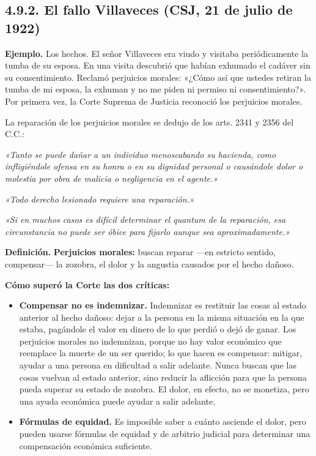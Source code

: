 \subsection{4.9.2. El fallo Villaveces (CSJ, 21 de julio de 1922)}
\begin{ejemplo}
\textcolor[HTML]{4F6228}{\textbf{Ejemplo. }}Los hechos. El señor Villaveces era viudo y visitaba periódicamente la tumba de su esposa. En una visita descubrió que habían exhumado el cadáver sin su consentimiento. Reclamó perjuicios morales: «¿Cómo así que ustedes retiran la tumba de mi esposa, la exhuman y no me piden ni permiso ni consentimiento?». Por primera vez, la Corte Suprema de Justicia reconoció los perjuicios morales.
\end{ejemplo}
La reparación de los perjuicios morales se dedujo de los arts. 2341 y 2356 del C.C.:

\begin{cita}
\textit{«Tanto se puede dañar a un individuo menoscabando su hacienda, como infligiéndole ofensa en su honra o en su dignidad personal o causándole dolor o molestia por obra de malicia o negligencia en el agente.»}
\par
\textit{«Todo derecho lesionado requiere una reparación.»}
\par
\textit{«Si en muchos casos es difícil determinar el quantum de la reparación, esa circunstancia no puede ser óbice para fijarlo aunque sea aproximadamente.»}
\end{cita}
\begin{definicion}
\textcolor[HTML]{1F3864}{\textbf{Definición. }}\textbf{Perjuicios morales: }buscan reparar —en estricto sentido, compensar— la zozobra, el dolor y la angustia causados por el hecho dañoso.
\end{definicion}
\textbf{Cómo superó la Corte las dos críticas:}

\begin{itemize}
\item \textbf{Compensar no es indemnizar.} Indemnizar es restituir las cosas al estado anterior al hecho dañoso: dejar a la persona en la misma situación en la que estaba, pagándole el valor en dinero de lo que perdió o dejó de ganar. Los perjuicios morales no indemnizan, porque no hay valor económico que reemplace la muerte de un ser querido; lo que hacen es compensar: mitigar, ayudar a una persona en dificultad a salir adelante. Nunca buscan que las cosas vuelvan al estado anterior, sino reducir la aflicción para que la persona pueda superar su estado de zozobra. El dolor, en efecto, no se monetiza, pero una ayuda económica puede ayudar a salir adelante.
\item \textbf{Fórmulas de equidad.} Es imposible saber a cuánto asciende el dolor, pero pueden usarse fórmulas de equidad y de arbitrio judicial para determinar una compensación económica suficiente.
\end{itemize}
